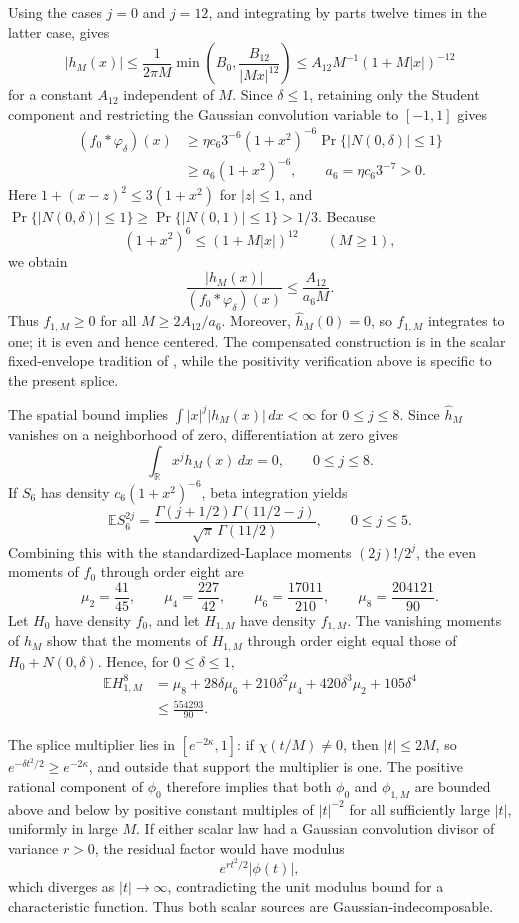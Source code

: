 Using the cases \(j=0\) and \(j=12\), and integrating by parts twelve times in the latter case, gives
\[
 |h_M(x)|
 \le \frac1{2\pi M}
 \min\!\left(B_0,\frac{B_{12}}{|Mx|^{12}}\right)
 \le A_{12}M^{-1}(1+M|x|)^{-12}
\]
for a constant \(A_{12}\) independent of \(M\).  Since \(\delta\le1\), retaining only the Student component and restricting the Gaussian convolution variable to \([-1,1]\) gives
\[
 \begin{aligned}
 (f_0*\varphi_\delta)(x)
 &\ge \eta c_6 3^{-6}(1+x^2)^{-6}
       \Pr\{|N(0,\delta)|\le1\}\\
 &\ge a_6(1+x^2)^{-6},
 \qquad a_6=\eta c_6 3^{-7}>0.
 \end{aligned}
\]
Here \(1+(x-z)^2\le3(1+x^2)\) for \(|z|\le1\), and
\(\Pr\{|N(0,\delta)|\le1\}\ge\Pr\{|N(0,1)|\le1\}>1/3\).  Because
\[
 (1+x^2)^6\le(1+M|x|)^{12}\qquad(M\ge1),
\]
we obtain
\[
 \frac{|h_M(x)|}{(f_0*\varphi_\delta)(x)}
 \le\frac{A_{12}}{a_6M}.
\]
Thus \(f_{1,M}\ge0\) for all \(M\ge2A_{12}/a_6\).  Moreover, \(\widehat h_M(0)=0\), so \(f_{1,M}\) integrates to one; it is even and hence centered.  The compensated construction is in the scalar fixed-envelope tradition of \cite{Meister2006}, while the positivity verification above is specific to the present splice.

The spatial bound implies \(\int |x|^j|h_M(x)|\,dx<\infty\) for \(0\le j\le8\).  Since \(\widehat h_M\) vanishes on a neighborhood of zero, differentiation at zero gives
\[
 \int_{\mathbb R}x^j h_M(x)\,dx=0,
 \qquad 0\le j\le8.
\]
If \(S_6\) has density \(c_6(1+x^2)^{-6}\), beta integration yields
\[
 \mathbb E S_6^{2j}
 =\frac{\Gamma(j+1/2)\Gamma(11/2-j)}
        {\sqrt\pi\,\Gamma(11/2)},
 \qquad 0\le j\le5.
\]
Combining this with the standardized-Laplace moments \((2j)!/2^j\), the even moments of \(f_0\) through order eight are
\[
 \mu_2=\frac{41}{45},\qquad
 \mu_4=\frac{227}{42},\qquad
 \mu_6=\frac{17011}{210},\qquad
 \mu_8=\frac{204121}{90}.
\]
Let \(H_0\) have density \(f_0\), and let \(H_{1,M}\) have density \(f_{1,M}\).  The vanishing moments of \(h_M\) show that the moments of \(H_{1,M}\) through order eight equal those of \(H_0+N(0,\delta)\).  Hence, for \(0\le\delta\le1\),
\[
 \begin{aligned}
 \mathbb E H_{1,M}^8
 &=\mu_8+28\delta\mu_6+210\delta^2\mu_4
   +420\delta^3\mu_2+105\delta^4\\
 &\le\frac{554293}{90}.
 \end{aligned}
\]

The splice multiplier lies in \([e^{-2\kappa},1]\): if \(\chi(t/M)\ne0\), then \(|t|\le2M\), so \(e^{-\delta t^2/2}\ge e^{-2\kappa}\), and outside that support the multiplier is one.  The positive rational component of \(\phi_0\) therefore implies that both \(\phi_0\) and \(\phi_{1,M}\) are bounded above and below by positive constant multiples of \(|t|^{-2}\) for all sufficiently large \(|t|\), uniformly in large \(M\).  If either scalar law had a Gaussian convolution divisor of variance \(r>0\), the residual factor would have modulus
\[
 e^{rt^2/2}|\phi(t)|,
\]
which diverges as \(|t|\to\infty\), contradicting the unit modulus bound for a characteristic function.  Thus both scalar sources are Gaussian-indecomposable.

